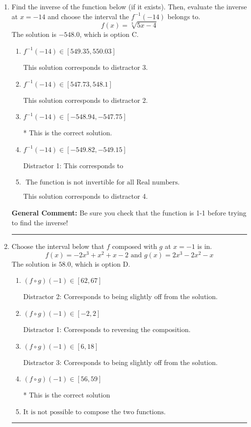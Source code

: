 \documentclass{extbook}[14pt]
\newcommand{\litem}[1]{\item #1

\rule{\textwidth}{0.4pt}}
\begin{document}
\begin{enumerate}\litem{
Find the inverse of the function below (if it exists). Then, evaluate the inverse at $x = -14$ and choose the interval the $f^{-1}(-14)$ belongs to.
\[ f(x) = \sqrt[3]{5 x - 4} \]The solution is \( -548.0 \), which is option C.\begin{enumerate}[label=\Alph*.]
\item \( f^{-1}(-14) \in [549.35, 550.03] \)

 This solution corresponds to distractor 3.
\item \( f^{-1}(-14) \in [547.73, 548.1] \)

 This solution corresponds to distractor 2.
\item \( f^{-1}(-14) \in [-548.94, -547.75] \)

* This is the correct solution.
\item \( f^{-1}(-14) \in [-549.82, -549.15] \)

 Distractor 1: This corresponds to 
\item \( \text{ The function is not invertible for all Real numbers. } \)

 This solution corresponds to distractor 4.
\end{enumerate}

\textbf{General Comment:} Be sure you check that the function is 1-1 before trying to find the inverse!
}
\litem{
Choose the interval below that $f$ composed with $g$ at $x=-1$ is in.
\[ f(x) = -2x^{3} + x^{2} +x -2 \text{ and } g(x) = 2x^{3} -2 x^{2} -x \]The solution is \( 58.0 \), which is option D.\begin{enumerate}[label=\Alph*.]
\item \( (f \circ g)(-1) \in [62, 67] \)

 Distractor 2: Corresponds to being slightly off from the solution.
\item \( (f \circ g)(-1) \in [-2, 2] \)

 Distractor 1: Corresponds to reversing the composition.
\item \( (f \circ g)(-1) \in [6, 18] \)

 Distractor 3: Corresponds to being slightly off from the solution.
\item \( (f \circ g)(-1) \in [56, 59] \)

* This is the correct solution
\item \( \text{It is not possible to compose the two functions.} \)


\end{enumerate}

}
\end{enumerate}
\end{document}
